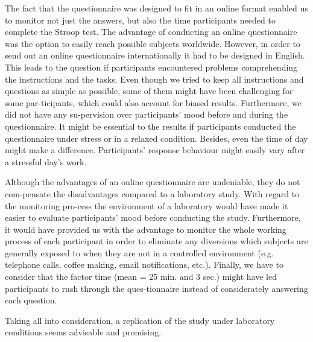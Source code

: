 The fact that the questionnaire was designed to fit in an online format enabled us to monitor not just the answers, but also the time participants needed to complete the Stroop test. The advantage of conducting an online questionnaire was the option to easily reach possible subjects worldwide. However, in order to send out an online questionnaire internationally it had to be designed in English. This leads to the question if participants encountered problems comprehending the instructions and the tasks. Even though we tried to keep all instructions and questions as simple as possible, some of them might have been challenging for some par-ticipants, which could also account for biased results. Furthermore, we did not have any su-pervision over participants’ mood before and during the questionnaire. It might be essential to the results if participants conducted the questionnaire under stress or in a relaxed condition. Besides, even the time of day might make a difference. Participants’ response behaviour might easily vary after a stressful day’s work.\par
Although the advantages of an online questionnaire are undeniable, they do not com-pensate the disadvantages compared to a laboratory study. With regard to the monitoring pro-cess the environment of a laboratory would have made it easier to evaluate participants’ mood before conducting the study. Furthermore, it would have provided us with the advantage to monitor the whole working process of each participant in order to eliminate any diversions which subjects are generally exposed to when they are not in a controlled environment (e.g. telephone calls, coffee making, email notifications, etc.). Finally, we have to consider that the factor time (mean = 25 min. and 3 sec.) might have led participants to rush through the ques-tionnaire instead of considerately answering each question.\par
Taking all into consideration, a replication of the study under laboratory conditions seems advisable and promising. \par
